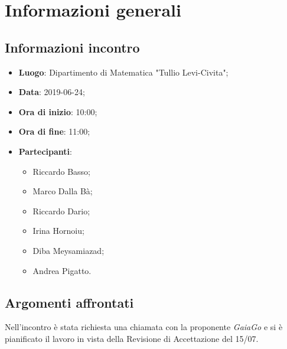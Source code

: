\section{Informazioni generali}

\subsection{Informazioni incontro}
\begin{itemize}
	\item \textbf{Luogo}: Dipartimento di Matematica "Tullio Levi-Civita";
	\item \textbf{Data}: 2019-06-24;
	\item \textbf{Ora di inizio}: 10:00;
	\item \textbf{Ora di fine}: 11:00;
	\item \textbf{Partecipanti}: 
	\begin{itemize}
		\item Riccardo Basso;
		\item Marco Dalla Bà;
		\item Riccardo Dario;
		\item Irina Hornoiu;
		\item Diba Meysamiazad;
		\item Andrea Pigatto.	
	\end{itemize}
\end{itemize}

\subsection{Argomenti affrontati}
Nell'incontro è stata richiesta una chiamata con la proponente \textit{GaiaGo} e si è pianificato il lavoro in vista della Revisione di Accettazione del 15/07.

